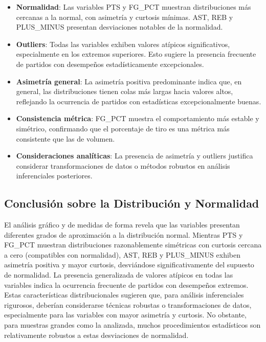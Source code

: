 \documentclass[12pt]{article}
\begin{document}
\begin{itemize}
    \item \textbf{Normalidad}: Las variables PTS y FG\_PCT muestran distribuciones más cercanas a la normal, con asimetría y curtosis mínimas. AST, REB y PLUS\_MINUS presentan desviaciones notables de la normalidad.
    
    \item \textbf{Outliers}: Todas las variables exhiben valores atípicos significativos, especialmente en los extremos superiores. Esto sugiere la presencia frecuente de partidos con desempeños estadísticamente excepcionales.
    
    \item \textbf{Asimetría general}: La asimetría positiva predominante indica que, en general, las distribuciones tienen colas más largas hacia valores altos, reflejando la ocurrencia de partidos con estadísticas excepcionalmente buenas.
    
    \item \textbf{Consistencia métrica}: FG\_PCT muestra el comportamiento más estable y simétrico, confirmando que el porcentaje de tiro es una métrica más consistente que las de volumen.
    
    \item \textbf{Consideraciones analíticas}: La presencia de asimetría y outliers justifica considerar transformaciones de datos o métodos robustos en análisis inferenciales posteriores.
\end{itemize}

\subsection{Conclusión sobre la Distribución y Normalidad}

El análisis gráfico y de medidas de forma revela que las variables presentan diferentes grados de aproximación a la distribución normal. Mientras PTS y FG\_PCT muestran distribuciones razonablemente simétricas con curtosis cercana a cero (compatibles con normalidad), AST, REB y PLUS\_MINUS exhiben asimetría positiva y mayor curtosis, desviándose significativamente del supuesto de normalidad. La presencia generalizada de valores atípicos en todas las variables indica la ocurrencia frecuente de partidos con desempeños extremos. Estas características distribucionales sugieren que, para análisis inferenciales rigurosos, deberían considerarse técnicas robustas o transformaciones de datos, especialmente para las variables con mayor asimetría y curtosis. No obstante, para muestras grandes como la analizada, muchos procedimientos estadísticos son relativamente robustos a estas desviaciones de normalidad.
\end{document}
